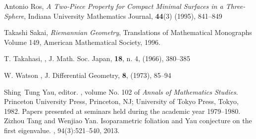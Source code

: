 \documentclass{amsart}
\theoremstyle{definition}
\theoremstyle{remark}
\begin{document}
\begin{thebibliography}{10}
 Antonio Ros,
\textit{A Two-Piece Property for Compact Minimal Surfaces in a Three-Sphere}, Indiana University Mathematics Journal, \textbf{44}(3) (1995), 841--849

 Takashi Sakai, \textit{Riemannian Geometry}, Translations
of Mathematical Monographs Volume 149, American Mathematical
Society, 1996.

 T. Takahasi, 
,
\newblock J. Math. Soc. Japan, \textbf{18}, n. 4, (1966), 380--385

 W. Watson 
,
\newblock J. Differential Geometry, \textbf{8}, (1973), 85--94

Shing~Tung Yau, editor.
, volume No. 102 of {\em
  Annals of Mathematics Studies}.
\newblock Princeton University Press, Princeton, NJ; University of Tokyo Press,
  Tokyo, 1982.
\newblock Papers presented at seminars held during the academic year
  1979--1980.
Zizhou Tang and Wenjiao Yan.
\newblock Isoparametric foliation and {Y}au conjecture on the first eigenvalue.
, 94(3):521--540, 2013.

\end{thebibliography}
\end{document}
